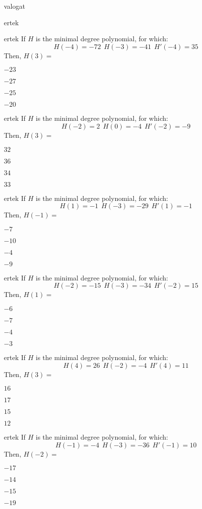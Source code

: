 \documentclass[12pt]{article}
\begin{document}
\begin{quiz}{valogat}
\begin{multi}{ertek}
\end{multi}
\begin{multi}{ertek}
If $H$ is the minimal degree polynomial, for which:
$$
H(-4)=-72 \ \  H(-3)=-41 \ \ H'(-4)=35
$$
Then, $H(3)=$
\item* $ -23 $
\item  $ -27 $
\item  $ -25 $
\item  $ -20 $
\end{multi}
\begin{multi}{ertek}
If $H$ is the minimal degree polynomial, for which:
$$
H(-2)=2 \ \  H(0)=-4 \ \ H'(-2)=-9
$$
Then, $H(3)=$
\item* $ 32 $
\item  $ 36 $
\item  $ 34 $
\item  $ 33 $
\end{multi}
\begin{multi}{ertek}
If $H$ is the minimal degree polynomial, for which:
$$
H(1)=-1 \ \  H(-3)=-29 \ \ H'(1)=-1
$$
Then, $H(-1)=$
\item* $ -7 $
\item  $ -10 $
\item  $ -4 $
\item  $ -9 $
\end{multi}
\begin{multi}{ertek}
If $H$ is the minimal degree polynomial, for which:
$$
H(-2)=-15 \ \  H(-3)=-34 \ \ H'(-2)=15
$$
Then, $H(1)=$
\item* $ -6 $
\item  $ -7 $
\item  $ -4 $
\item  $ -3 $
\end{multi}
\begin{multi}{ertek}
If $H$ is the minimal degree polynomial, for which:
$$
H(4)=26 \ \  H(-2)=-4 \ \ H'(4)=11
$$
Then, $H(3)=$
\item* $ 16 $
\item  $ 17 $
\item  $ 15 $
\item  $ 12 $
\end{multi}
\begin{multi}{ertek}
If $H$ is the minimal degree polynomial, for which:
$$
H(-1)=-4 \ \  H(-3)=-36 \ \ H'(-1)=10
$$
Then, $H(-2)=$
\item* $ -17 $
\item  $ -14 $
\item  $ -15 $
\item  $ -19 $

\end{multi}
\end{quiz}
\end{document}
